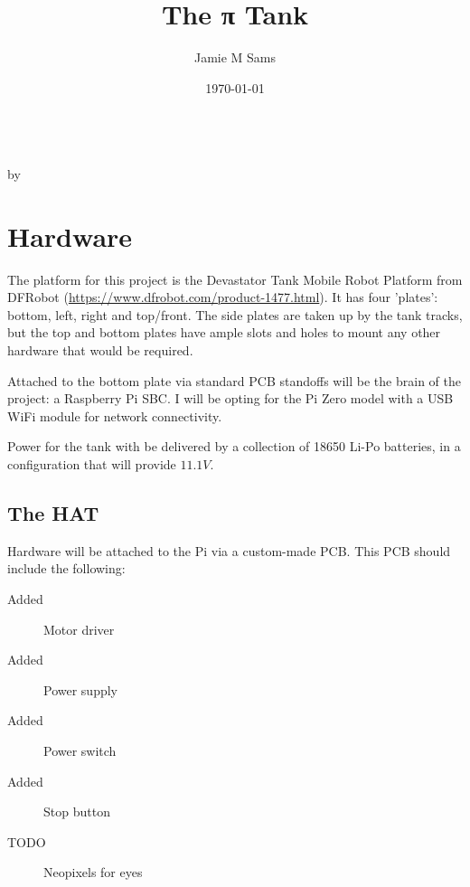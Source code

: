 \documentclass[a4paper,openany,nomultitoc]{dndbook}
\title{The π Tank}
\author{Jamie M Sams}
\date{\today}
\begin{document}
\DndSetThemeColor[DmgLavender]

\frontmatter

\begin{titlepage}
	\vspace*{\fill}
	\centering
	{\Huge \thetitle}\\
	\vspace*{\fill}
	{\large by \theauthor}
\end{titlepage}


\mainmatter%

\FloatBarrier
\chapter{Hardware}
\FloatBarrier
\begin{multicols}{2}

The platform for this project is the Devastator Tank Mobile Robot Platform from DFRobot (\url{https://www.dfrobot.com/product-1477.html}).  It has four 'plates': bottom, left, right and top/front.  The side plates are taken up by the tank tracks, but the top and bottom plates have ample slots and holes to mount any other hardware that would be required.

Attached to the bottom plate via standard PCB standoffs will be the brain of the project: a Raspberry Pi SBC.  I will be opting for the Pi Zero model with a USB WiFi module for network connectivity.

Power for the tank with be delivered by a collection of 18650 Li-Po batteries, in a configuration that will provide $11.1V$.

\section{The HAT}

Hardware will be attached to the Pi via a custom-made PCB.  This PCB should include the following:
\begin{description}
\item[Added]Motor driver
\item[Added]Power supply
\item[Added]Power switch
\item[Added]Stop button
\item[TODO]Neopixels for eyes
\end{description}

\end{multicols}
\end{document}

